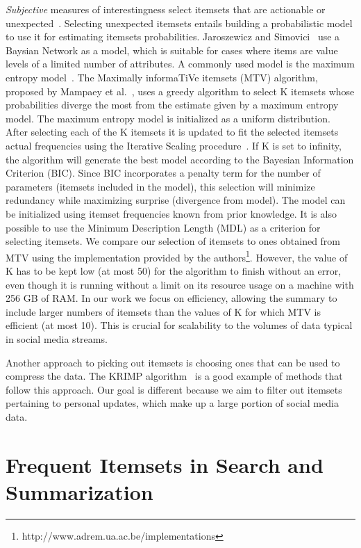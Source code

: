 \documentclass[letterpaper,12pt,titlepage,oneside,final]{book}
\begin{document}
\emph{Subjective} measures of interestingness select itemsets that are actionable or unexpected~\cite{silberschatz1995subjective}.
Selecting unexpected itemsets entails building a probabilistic model to use it for 
estimating itemsets probabilities. 
Jaroszewicz and Simovici~\cite{jaroszewicz2004interestingness} use a Baysian Network as a model,
which is suitable for cases where items are value levels of a limited number of attributes.
A commonly used model is the maximum entropy model~\cite{wang2006summarizing,tatti2008maximum,mampaey2011tell}.
The Maximally informaTiVe itemsets (MTV) algorithm, proposed by Mampaey et al.~\cite{mampaey2011tell},
uses a greedy algorithm to select K itemsets whose probabilities diverge the most 
from the estimate given by a maximum entropy model.
The maximum entropy model is initialized as a uniform distribution.
After selecting each of the K itemsets it is updated 
to fit the selected itemsets actual frequencies
using the Iterative Scaling procedure~\cite{darroch1972generalized}.
If K is set to infinity, the algorithm will generate the best model
according to the Bayesian Information Criterion (BIC). 
Since BIC incorporates a penalty term for the number of parameters
(itemsets included in the model), this selection will  
minimize redundancy while maximizing surprise (divergence from model).
The model can be initialized using itemset frequencies known
from prior knowledge. 
It is also possible to use the Minimum Description Length (MDL)
as a criterion for selecting itemsets.
We compare our selection of itemsets to ones obtained from MTV using 
the implementation provided by the authors\footnote{http://www.adrem.ua.ac.be/implementations}.
However, the value of K has to be kept low (at most 50) for the algorithm to finish without an error, 
even though it is running without a limit on its resource usage on a machine with 256 GB of RAM.
In our work we focus on efficiency, allowing the summary to include larger numbers
of itemsets than the values of K for which MTV is efficient (at most 10). 
This is crucial for scalability to the volumes of data typical in social media streams.

Another approach to picking out itemsets is choosing ones that 
can be used to compress the data. The KRIMP algorithm~\cite{vreeken2011krimp} is 
a good example of methods that follow this approach. Our goal is different because
we aim to filter out itemsets pertaining to personal updates, which make up a large
portion of social media data. 

\section{Frequent Itemsets in Search and Summarization}
\end{document}
